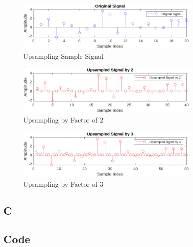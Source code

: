 \documentclass[a4paper,12pt]{article}
\begin{document}
\begin{figure}[h!]
    \centering
    \includegraphics[width=0.8\textwidth]{figs/og_up.png}
    \caption{Upsampling Sample Signal}
    \label{fig:upsampling}
\end{figure}

\begin{figure}[h!]
    \centering
    \includegraphics[width=0.8\textwidth]{figs/2_up.png}
    \caption{Upsampling by Factor of 2}
    \label{fig:upsampling_2}
\end{figure}

\begin{figure}[h!]
    \centering
    \includegraphics[width=0.8\textwidth]{figs/3_up.png}
    \caption{Upsampling by Factor of 3}
    \label{fig:upsampling_3}
\end{figure}

\newpage
\subsection{C}

\subsection*{Code}
\end{document}
